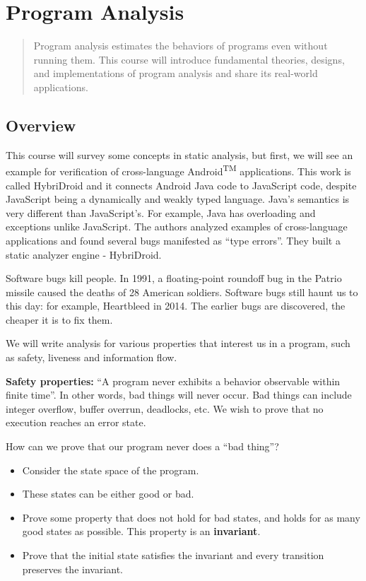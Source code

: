 \section{Program Analysis}
\begin{abstract}
	Program analysis estimates the behaviors of programs even without running them. This course will introduce fundamental theories, designs, and implementations of program analysis and share its real-world applications.
\end{abstract}

\subsection{Overview}

This course will survey some concepts in static analysis, but first, we will see an example
for verification of cross-language Android\textsuperscript{TM} applications.
This work is called HybriDroid and it connects Android Java code to JavaScript code,
despite JavaScript being a dynamically and weakly typed language.
Java's semantics is very different than JavaScript's. 
For example, Java has overloading and exceptions unlike JavaScript.
The authors analyzed examples of cross-language applications and found
several bugs manifested as ``type errors''.
They built a static analyzer engine - HybriDroid.

Software bugs kill people. In 1991, a floating-point roundoff bug
in the Patrio missile caused the deaths of 28 American soldiers.
Software bugs still haunt us to this day: for example, Heartbleed
in 2014. The earlier bugs are discovered, the cheaper it is to fix them.

We will write analysis for various properties that
interest us in a program, such as safety, liveness
and information flow.

\textbf{Safety properties:} ``A program never exhibits a behavior observable within finite time''.
In other words, bad things will never occur. Bad things can include integer overflow,
buffer overrun, deadlocks, etc. We wish to prove that no execution reaches
an error state.

How can we prove that our program never does a ``bad thing''?
\begin{itemize}
\item Consider the state space of the program.
\item These states can be either good or bad.
\item Prove some property that does not hold for
bad states, and holds for as many good states as possible. This property
is an \textbf{invariant}.
\item Prove that the initial state satisfies the invariant and every
transition preserves the invariant.
\end{itemize}

